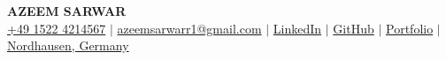 


\begin{center}
    \textbf{\Huge \scshape AZEEM SARWAR} \\ \vspace{3pt}
    \small
    \faMobile \hspace{.5pt} \href{tel:15224214567}{+49 1522 4214567}
    $|$
    \faAt \hspace{.5pt} \href{mailto:azeemsarwarr1@gmail.com}{azeemsarwarr1@gmail.com}
    $|$
    \faLinkedinSquare \hspace{.5pt} \href{https://www.linkedin.com/in/azeemsarwarr}{LinkedIn}
    $|$
    \faGithub \hspace{.5pt} \href{https://github.com/azeem-sarwar}{GitHub}
    $|$
    \faGlobe \hspace{.5pt} \href{https://azeemsarwar.de}{Portfolio}
    $|$
    \faMapMarker \hspace{.5pt} \href{https://www.google.com/maps/place/Bochumer+Str.+32,+99734+Nordhausen/@51.5010673,10.77899,16z/data=!3m1!4b1!4m6!3m5!1s0x47a4ff959ae4db47:0xd2b3f72e1a98c0b3!8m2!3d51.501064!4d10.7815703!16s%2Fg%2F11c5c6fxjd?entry=ttu&g_ep=EgoyMDI0MTIxMS4wIKXMDSoASAFQAw%3D%3D}{Nordhausen, Germany}
\end{center}